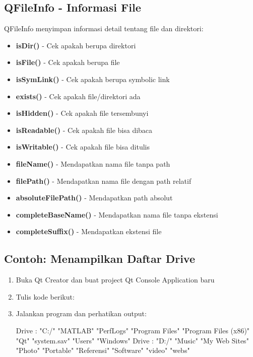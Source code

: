 \subsection{QFileInfo - Informasi File}

QFileInfo menyimpan informasi detail tentang file dan direktori:

\begin{itemize}
\item \textbf{isDir()} - Cek apakah berupa direktori
\item \textbf{isFile()} - Cek apakah berupa file
\item \textbf{isSymLink()} - Cek apakah berupa symbolic link
\item \textbf{exists()} - Cek apakah file/direktori ada
\item \textbf{isHidden()} - Cek apakah file tersembunyi
\item \textbf{isReadable()} - Cek apakah file bisa dibaca
\item \textbf{isWritable()} - Cek apakah file bisa ditulis
\item \textbf{fileName()} - Mendapatkan nama file tanpa path
\item \textbf{filePath()} - Mendapatkan nama file dengan path relatif
\item \textbf{absoluteFilePath()} - Mendapatkan path absolut
\item \textbf{completeBaseName()} - Mendapatkan nama file tanpa ekstensi
\item \textbf{completeSuffix()} - Mendapatkan ekstensi file
\end{itemize}

\subsection{Contoh: Menampilkan Daftar Drive}

\begin{enumerate}
\item Buka Qt Creator dan buat project Qt Console Application baru
\item Tulis kode berikut:



\item Jalankan program dan perhatikan output:

\begin{lcverbatim}
Drive :  "C:/"
  "MATLAB"
  "PerfLogs"
  "Program Files"
  "Program Files (x86)"
  "Qt"
  "system.sav"
  "Users"
  "Windows"
Drive :  "D:/"
  "Music"
  "My Web Sites"
  "Photo"
  "Portable"
  "Referensi"
  "Software"
  "video"
  "webs"
\end{lcverbatim}
\end{enumerate}

